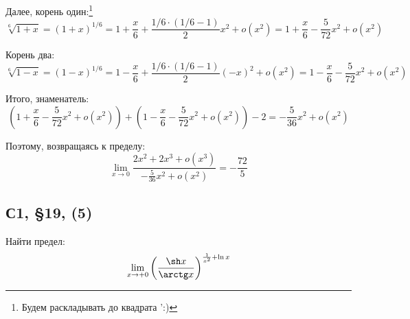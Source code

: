 \documentclass[a4paper,12pt]{article}
\begin{document}
\begin{solution}
    Далее, корень один:\footnote{
      Будем раскладывать до квадрата ':)
    }
    \[
      \sqrt[6]{1 + x} = (1 + x)^{1/6} = 1 + \frac{x}{6} + \frac{1/6 \cdot (1/6 - 1)}{2} x^2 + o(x^2) = 1 + \frac{x}{6} - \frac{5}{72} x^2 + o(x^2)
    \]

    Корень два:
    \[
      \sqrt[6]{1 - x} = (1 - x)^{1/6} = 1 - \frac{x}{6} + \frac{1/6 \cdot (1/6 - 1)}{2} (-x)^2 + o(x^2) = 1 - \frac{x}{6} - \frac{5}{72} x^2 + o(x^2)
    \]

    Итого, знаменатель:
    \[
      \left(1 + \frac{x}{6} - \frac{5}{72} x^2 + o(x^2)\right) + \left(1 - \frac{x}{6} - \frac{5}{72} x^2 + o(x^2)\right) - 2 = -\frac{5}{36} x^2 + o(x^2)
    \]

    Поэтому, возвращаясь к пределу:
    \[
      \lim_{x \to 0} \frac{2x^2 + 2x^3 + o(x^3)}{-\frac{5}{36} x^2 + o(x^2)} = -\frac{72}{5}
    \]
  \end{solution}
  
  
  
  \subsection{С1, \S 19, (5)}
  
  Найти предел:
  \[
    \lim_{x \to +0} \left(
      \frac{\sh x}{\arctg x}
    \right)^{
      \frac{1}{x^2} + \ln x
    }
  \]
  
\end{document}
